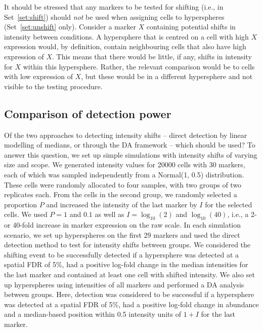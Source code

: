 \documentclass{article}
\begin{document}
It should be stressed that any markers to be tested for shifting (i.e., in Set~\ref{set:shift}) should \textit{not} be used when assigning cells to hyperspheres (Set~\ref{set:unshift} only).
Consider a marker $X$ containing potential shifts in intensity between conditions.
A hypersphere that is centred on a cell with high $X$ expression would, by definition, contain neighbouring cells that also have high expression of $X$.
This means that there would be little, if any, shifts in intensity for $X$ within this hypersphere.
Rather, the relevant comparison would be to cells with low expression of $X$, but these would be in a different hypersphere and not visible to the testing procedure.

\subsection{Comparison of detection power}
Of the two approaches to detecting intensity shifts -- direct detection by linear modelling of medians, or through the DA framework -- which should be used?
To answer this question, we set up simple simulations with intensity shifts of varying size and scope.
We generated intensity values for 20000 cells with 30 markers, each of which was sampled independently from a Normal(1, 0.5) distribution.
These cells were randomly allocated to four samples, with two groups of two replicates each.
From the cells in the second group, we randomly selected a proportion $P$ and increased the intensity of the last marker by $I$ for the selected cells.
We used $P=1$ and $0.1$ as well as $I=\log_{10}(2)$ and $\log_{10}(40)$, i.e., a 2- or 40-fold increase in marker expression on the raw scale.
In each simulation scenario, we set up hyperspheres on the first 29 markers and used the direct detection method to test for intensity shifts between groups.
We considered the shifting event to be successfully detected if a hypersphere was detected at a spatial FDR of 5\%, had a positive log-fold change in the median intensities for the last marker and contained at least one cell with shifted intensity.
We also set up hyperspheres using intensities of all markers and performed a DA analysis between groups.
Here, detection was considered to be successful if a hypersphere was detected at a spatial FDR of 5\%, had a positive log-fold change in abundance and a median-based position within 0.5 intensity units of $1+I$ for the last marker.

\end{document}
